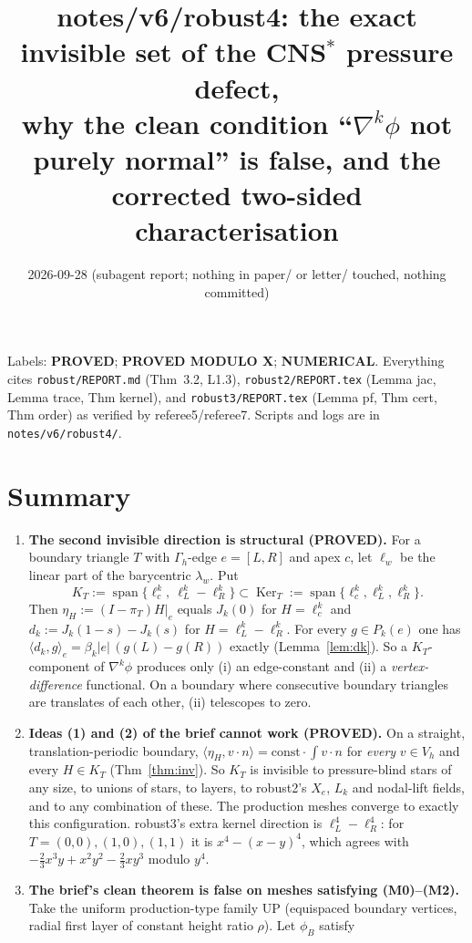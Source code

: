 \documentclass[11pt]{article}
\title{notes/v6/robust4: the exact invisible set of the CNS$^\ast$ pressure defect,\\ why the clean condition
``$\nabla^k\phi$ not purely normal'' is false, and the corrected two-sided characterisation}
\date{2026-09-28 (subagent report; nothing in paper/ or letter/ touched, nothing committed)}
\theoremstyle{remark}
\newcommand{\Gh}{\Gamma_h}
\newcommand{\ip}[2]{\langle #1,#2\rangle}
\begin{document}
\maketitle

\noindent Labels: \textbf{PROVED}; \textbf{PROVED MODULO X}; \textbf{NUMERICAL}. Everything cites
\texttt{robust/REPORT.md} (Thm~3.2, L1.3), \texttt{robust2/REPORT.tex} (Lemma jac, Lemma trace, Thm kernel), and
\texttt{robust3/REPORT.tex} (Lemma pf, Thm cert, Thm order) as verified by referee5/referee7. Scripts and logs are in
\texttt{notes/v6/robust4/}.

\section*{Summary}
\begin{enumerate}
\item \textbf{The second invisible direction is structural (PROVED).} For a boundary triangle $T$ with $\Gh$-edge
$e=[L,R]$ and apex $c$, let $\ell_w$ be the linear part of the barycentric $\lambda_w$. Put
\[
K_T:=\operatorname{span}\{\ell_c^k,\ \ell_L^k-\ell_R^k\}\subset\operatorname{Ker}_T:=\operatorname{span}\{\ell_c^k,\ell_L^k,\ell_R^k\}.
\]
Then $\eta_H:=(I-\pi_T)H|_e$ equals $J_k(0)$ for $H=\ell_c^k$ and $d_k:=J_k(1-s)-J_k(s)$ for $H=\ell_L^k-\ell_R^k$. For
every $g\in P_k(e)$ one has $\ip{d_k}{g}_e=\beta_k|e|\,(g(L)-g(R))$ exactly (Lemma~\ref{lem:dk}). So a $K_T$-component of
$\nabla^k\phi$ produces only (i) an edge-constant and (ii) a \emph{vertex-difference} functional. On a boundary where
consecutive boundary triangles are translates of each other, (ii) telescopes to zero.
\item \textbf{Ideas (1) and (2) of the brief cannot work (PROVED).} On a straight, translation-periodic boundary,
$\ip{\eta_H}{v\cdot n}=\mathrm{const}\cdot\int v\cdot n$ for \emph{every} $v\in V_h$ and every $H\in K_T$
(Thm~\ref{thm:inv}). So $K_T$ is invisible to pressure-blind stars of any size, to unions of stars, to layers, to
robust2's $X_e$, $L_k$ and nodal-lift fields, and to any combination of these. The production meshes converge to exactly this
configuration. robust3's extra kernel direction is $\ell_L^4-\ell_R^4$: for $T=(0,0),(1,0),(1,1)$ it is
$x^4-(x-y)^4$, which agrees with $-\tfrac23x^3y+x^2y^2-\tfrac23xy^3$ modulo $y^4$.
\item \textbf{The brief's clean theorem is false on meshes satisfying (M0)--(M2).} Take the uniform production-type family
\textsf{UP} (equispaced boundary vertices, radial first layer of constant height ratio $\rho$). Let $\phi_B$ satisfy

\end{enumerate}
\end{document}
